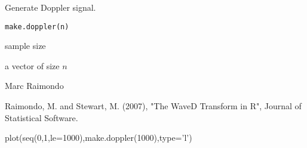 \begin{Description}\relax
Generate Doppler signal.
\end{Description}
\begin{Usage}
\begin{verbatim}
make.doppler(n)
\end{verbatim}
\end{Usage}
\begin{Arguments}
\begin{ldescription}
\item[\code{n}] sample size
\end{ldescription}
\end{Arguments}
\begin{Value}
a vector of size $n$
\end{Value}
\begin{Author}\relax
Marc Raimondo
\end{Author}
\begin{References}\relax
Raimondo, M. and Stewart, M. (2007),
"The WaveD Transform in R", Journal of Statistical Software.
\end{References}
\begin{SeeAlso}\relax
{}
\end{SeeAlso}
\begin{Examples}
\begin{ExampleCode}
plot(seq(0,1,le=1000),make.doppler(1000),type='l')
\end{ExampleCode}
\end{Examples}

